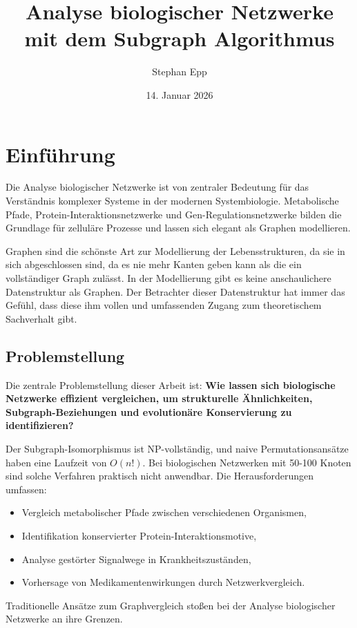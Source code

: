 ﻿\documentclass[a4paper,12pt]{article}
\title{\textbf{Analyse biologischer Netzwerke}\\{\Large mit dem Subgraph Algorithmus}}
\author{Stephan Epp}
\date{14. Januar 2026}
\theoremstyle{definition}
\begin{document}
	
\maketitle

\tableofcontents
\newpage

\section{Einführung}

Die Analyse biologischer Netzwerke ist von zentraler Bedeutung für das Verständnis komplexer Systeme in der modernen Systembiologie. Metabolische Pfade, Protein-Interaktions\-netzwerke und Gen-Regulationsnetzwerke bilden die Grundlage für zelluläre Prozesse und lassen sich elegant als Graphen modellieren.

Graphen sind die schönste Art zur Modellierung der Lebensstrukturen, da sie in sich abgeschlossen sind, da es nie mehr Kanten geben kann als die ein vollständiger Graph zulässt. In der Modellierung gibt es keine anschaulichere Datenstruktur als Graphen. Der Betrachter dieser Datenstruktur hat immer das Gefühl, dass diese ihm vollen und umfassenden Zugang zum theoretischem Sachverhalt gibt. 

\subsection{Problemstellung}

Die zentrale Problemstellung dieser Arbeit ist: \textbf{Wie lassen sich biologische Netzwerke effizient vergleichen, um strukturelle Ähnlichkeiten, Subgraph-Beziehungen und evolutionäre Konservierung zu identifizieren?}

Der Subgraph-Isomorphismus ist NP-vollständig, und naive Permutationsansätze haben eine Laufzeit von $O(n!)$. Bei biologischen Netzwerken mit 50-100 Knoten sind solche Verfahren praktisch nicht anwendbar. Die Herausforderungen umfassen:
\begin{itemize}
	\item[-] Vergleich metabolischer Pfade zwischen verschiedenen Organismen,
	\item[-] Identifikation konservierter Protein-Interaktionsmotive,
	\item[-] Analyse gestörter Signalwege in Krankheitszuständen,
	\item[-] Vorhersage von Medikamentenwirkungen durch Netzwerkvergleich.
\end{itemize}
Traditionelle Ansätze zum Graphvergleich stoßen bei der Analyse biologischer Netzwerke an ihre Grenzen.
\end{document}
